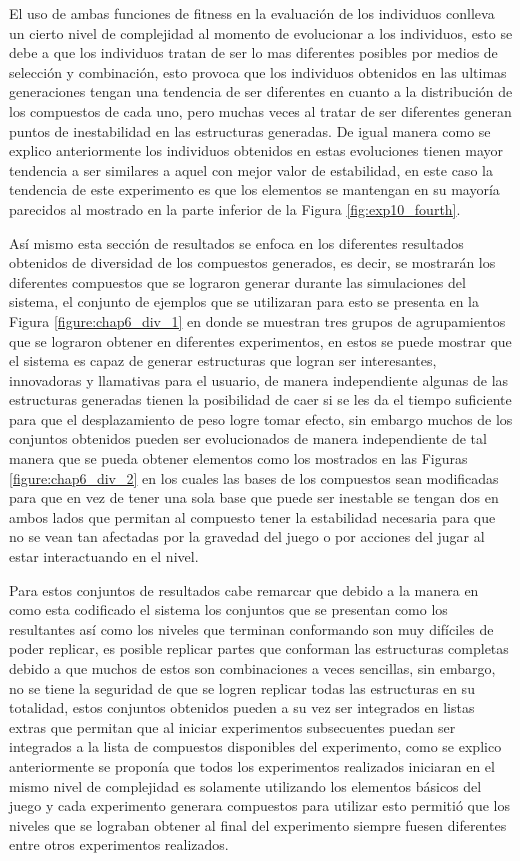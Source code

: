 El uso de ambas funciones de fitness en la evaluación de los individuos conlleva
un cierto nivel de complejidad al momento de evolucionar a los individuos, esto
se debe a que los individuos tratan de ser lo mas diferentes posibles por medios
de selección y combinación, esto provoca que los individuos obtenidos en las
ultimas generaciones tengan una tendencia de ser diferentes en cuanto a la
distribución de los compuestos de cada uno, pero muchas veces al tratar de ser
diferentes generan puntos de inestabilidad en las estructuras generadas. De
igual manera como se explico anteriormente los individuos obtenidos en estas
evoluciones tienen mayor tendencia a ser similares a aquel con mejor valor de
estabilidad, en este caso la tendencia de este experimento es que los elementos
se mantengan en su mayoría parecidos al mostrado en la parte inferior de la
Figura \ref{fig:exp10_fourth}.

Así mismo esta sección de resultados se enfoca en los diferentes resultados
obtenidos de diversidad de los compuestos generados, es decir, se mostrarán los
diferentes compuestos que se lograron generar durante las simulaciones del
sistema, el conjunto de ejemplos que se utilizaran para esto se presenta en la
Figura \ref{figure:chap6_div_1} en donde se muestran tres grupos de
agrupamientos que se lograron obtener en diferentes experimentos, en estos se
puede mostrar que el sistema es capaz de generar estructuras que logran ser
interesantes, innovadoras y llamativas para el usuario, de manera independiente
algunas de las estructuras generadas tienen la posibilidad de caer si se les da
el tiempo suficiente para que el desplazamiento de peso logre tomar efecto, sin
embargo muchos de los conjuntos obtenidos pueden ser evolucionados de manera
independiente de tal manera que se pueda obtener elementos como los mostrados en
las Figuras \ref{figure:chap6_div_2} en los cuales las bases de los compuestos
sean modificadas para que en vez de tener una sola base que puede ser inestable
se tengan dos en ambos lados que permitan al compuesto tener la estabilidad
necesaria para que no se vean tan afectadas por la gravedad del juego o por
acciones del jugar al estar interactuando en el nivel.

Para estos conjuntos de resultados cabe remarcar que debido a la manera en como
esta codificado el sistema los conjuntos que se presentan como los resultantes
así como los niveles que terminan conformando son muy difíciles de poder
replicar, es posible replicar partes que conforman las estructuras completas
debido a que muchos de estos son combinaciones a veces sencillas, sin embargo, no
se tiene la seguridad de que se logren replicar todas las estructuras en su
totalidad, estos conjuntos obtenidos pueden a su vez ser integrados en listas
extras que permitan que al iniciar experimentos subsecuentes puedan ser
integrados a la lista de compuestos disponibles del experimento, como se explico
anteriormente se proponía que todos los experimentos realizados iniciaran en el
mismo nivel de complejidad es solamente utilizando los elementos básicos del
juego y cada experimento generara compuestos para utilizar esto permitió que los
niveles que se lograban obtener al final del experimento siempre fuesen
diferentes entre otros experimentos realizados.

